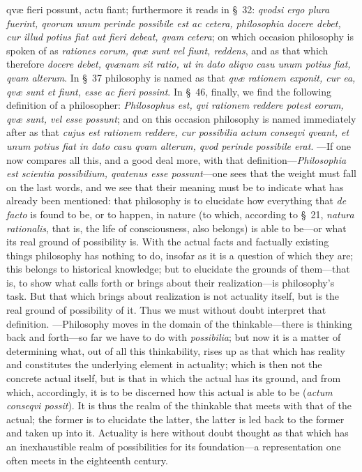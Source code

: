 \documentclass[12pt,a4paper]{book}
\begin{document}
{{qvæ fieri possunt, actu fiant}; furthermore it reads in \S~32: \textit{qvodsi ergo
plura fuerint, qvorum unum perinde possibile est ac cetera, philosophia docere
debet, cur illud potius fiat aut fieri debeat, qvam cetera}; on which occasion
philosophy is spoken of as \textit{rationes eorum, qvæ sunt vel fiunt, reddens}, and
as that which therefore \textit{docere debet, qvænam sit ratio, ut in dato aliqvo
casu unum potius fiat, qvam alterum}. In \S~37 philosophy is named as that
\textit{qvæ rationem exponit, cur ea, qvæ sunt et fiunt, esse ac fieri possint}. In
\S~46, finally, we find the following definition of a philosopher: \textit{Philosophus
est, qvi rationem reddere potest eorum, qvæ sunt, vel esse possunt}; and on this
occasion philosophy is named immediately after as that \textit{cujus est rationem
reddere, cur possibilia actum conseqvi qveant, et unum potius fiat in dato casu qvam
alterum, qvod perinde possibile erat}. ---If one now compares all this, and a good
deal more, with that definition---\textit{Philosophia est scientia possibilium,
qvatenus esse possunt}---one sees that the weight must fall on the last words, and
we see that their meaning must be to indicate what has already been mentioned: that
philosophy is to elucidate how everything that \textit{de facto} is found to be, or
to happen, in nature (to which, according to \S~21, \textit{natura rationalis}, that
is, the life of consciousness, also belongs) is able to be---or what its real ground
of possibility is. With the actual facts and factually existing things philosophy
has nothing to do, insofar as it is a question of which they are; this belongs to
historical knowledge; but to elucidate the grounds of them---that is, to show what
calls forth or brings about their realization---is philosophy's task. But that which
brings about realization is not actuality itself, but is the real ground of
possibility of it. Thus we must without doubt interpret that definition.
---Philosophy moves in the domain of the thinkable---there is thinking back and
forth---so far we have to do with \textit{possibilia}; but now it is a matter of
determining what, out of all this thinkability, rises up as that which has reality
and constitutes the underlying element in actuality; which is then not the concrete
actual itself, but is that in which the actual has its ground, and from which,
accordingly, it is to be discerned how this actual is able to be (\textit{actum
conseqvi possit}). It is thus the realm of the thinkable that meets with that of the
actual; the former is to elucidate the latter, the latter is led back to the former
and taken up into it. Actuality is here without doubt thought as that which has an
inexhaustible realm of possibilities for its foundation---a representation one often
meets in the eighteenth century.\par}
\end{document}
